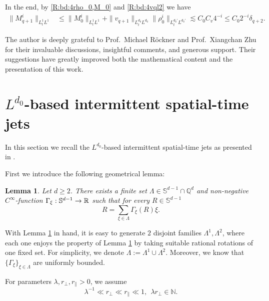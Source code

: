 \documentclass[10pt,a4paper]{amsart}
\numberwithin{equation}{section}
\def\theequation{\arabic{section}.\arabic{equation}}
\newtheorem{lemma}[theorem]{Lemma}
\def\geq{\geqslant}
\def\leq{\leqslant}
\def\bl{\begin{lemma}}
\def\el{\end{lemma}}
\def\geq{\geqslant}
\def\leq{\leqslant}
\begin{document}
In the end,  by \eqref{R:bd:4rho_0,M_0}  and \eqref{R:bd:4vql2} we have  
\begin{align*}
    \|M^{i}_{q+1}\|_{L^1_tL^1}&\leq \|M^{i}_{0}\|_{L^1_tL^1}+\|v_{q+1}\|_{L^{d_0}_tL^{d_0}}\|\rho^{i}_0\|_{L^{d_0'}_tL^{d_0'}} \lesssim C_0 C_v 4^{-i}  \leq C_0 2^{-i}\delta_{q+2}.
\end{align*} 
 

The author is deeply grateful to Prof.~Michael R\"ockner and
Prof.~Xiangchan Zhu for their invaluable discussions, insightful comments, and
generous support. Their suggestions have greatly improved both the mathematical
content and the presentation of this work. 



 
\appendix
 \renewcommand{\appendixname}{Appendix~\Alph{section}}
  \renewcommand{\theequation}{A.\arabic{equation}}


\section{$L^{d_0}$-based  intermittent spatial-time jets}\label{gij}

In this section we recall the $L^{d_0}$-based intermittent spatial-time jets as  presented in  \cite[Appendix C.1]{LRZ25}. 

First we introduce  the following geometrical lemma:
\bl\cite[Lemma 3.1]{BCDL21}\label{lem:cv2}
Let $d\geq2$. There exists a finite set $\Lambda\in \mathbb{S}^{d-1}\cap \mathbb{Q}^d $ and non-negative $C^\infty$-function  $\Gamma_{\xi}:\mathbb{S}^{d-1}\to\mathbb R $ such
that for every $R \in \mathbb{S}^{d-1}$
$$R=\sum_{\xi\in\Lambda}\Gamma_\xi(R)\xi.$$
\el
 With Lemma \ref{lem:cv2} in hand,   it is easy to generate $2$ disjoint families $\Lambda^{1},\Lambda^{2}$, where each one enjoys the property of Lemma \ref{lem:cv2} by taking suitable rational rotations of one fixed set. For simplicity, we denote $\Lambda:= \Lambda^{1}\cup\Lambda^{2}$. Moreover, we know that  $\{\Gamma_{\xi}\}_{\xi\in \Lambda }$ are uniformly bounded.


For parameters $\lambda,r_\perp, r_\parallel > 0 $, we assume
$$\lambda^{-1}\ll r_{\perp}\ll r_{\parallel}\ll 1,\ \ \lambda r_{\perp}\in\mathbb{N}.$$

 
\end{document}
